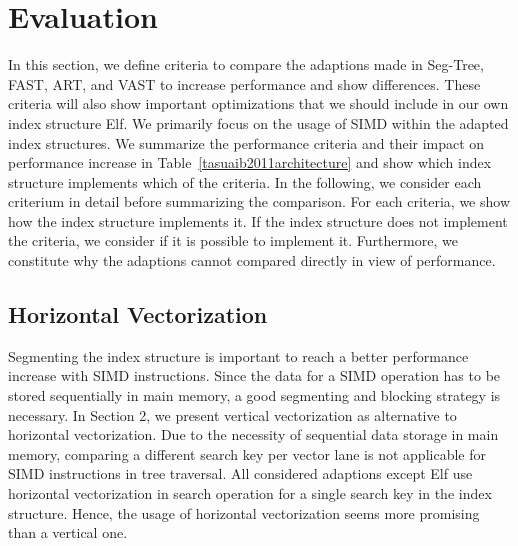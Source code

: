 \documentclass[runningheads,a4paper]{llncs}
\begin{document}
\section{Evaluation}
In this section, we define criteria to compare the adaptions made in Seg-Tree, FAST, ART, and VAST to increase performance and show differences. These criteria will also show important optimizations that we should include in our own index structure Elf. We primarily focus on the usage of SIMD within the adapted index structures. %
We summarize the performance criteria and their impact on performance increase in Table~\ref{tasuaib2011architecture} and show which index structure implements which of the criteria. In the following, we consider each criterium in detail before summarizing the comparison. For each criteria, we show how the index structure implements it. If the index structure does not implement the criteria, we consider if it is possible to implement it. Furthermore, we constitute why the adaptions cannot compared directly in view of performance.

\subsection{Horizontal Vectorization}
Segmenting the index structure is important to reach a better performance increase with SIMD instructions. Since the data for a SIMD operation has to be stored sequentially in main memory, a good segmenting and blocking strategy is necessary. In Section 2, we present vertical vectorization as alternative to horizontal vectorization. Due to the necessity of sequential data storage in main memory, comparing a different search key per vector lane is not applicable for SIMD instructions in tree traversal. All considered adaptions except Elf use horizontal vectorization in search operation for a single search key in the index structure. Hence, the usage of horizontal vectorization seems more promising than a vertical one.

\end{document}
